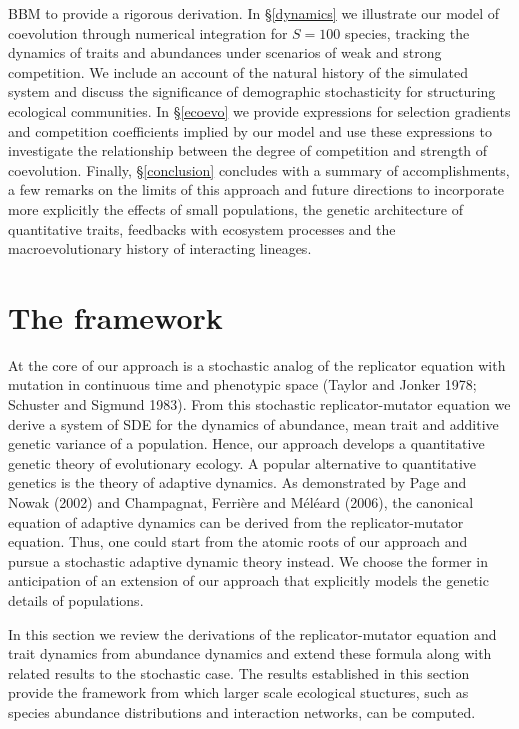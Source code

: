 \documentclass[]{article}
\begin{document}
BBM to provide a rigorous derivation. In \S\ref{dynamics} we illustrate
our model of coevolution through numerical integration for \(S=100\)
species, tracking the dynamics of traits and abundances under scenarios
of weak and strong competition. We include an account of the natural
history of the simulated system and discuss the significance of
demographic stochasticity for structuring ecological communities. In
\S\ref{ecoevo} we provide expressions for selection gradients and
competition coefficients implied by our model and use these expressions
to investigate the relationship between the degree of competition and
strength of coevolution. Finally, \S\ref{conclusion} concludes with a
summary of accomplishments, a few remarks on the limits of this approach
and future directions to incorporate more explicitly the effects of
small populations, the genetic architecture of quantitative traits,
feedbacks with ecosystem processes and the macroevolutionary history of
interacting lineages.

\hypertarget{the-framework}{%
\section{The framework}\label{the-framework}}

At the core of our approach is a stochastic analog of the replicator
equation with mutation in continuous time and phenotypic space (Taylor
and Jonker 1978; Schuster and Sigmund 1983). From this stochastic
replicator-mutator equation we derive a system of SDE for the dynamics
of abundance, mean trait and additive genetic variance of a population.
Hence, our approach develops a quantitative genetic theory of
evolutionary ecology. A popular alternative to quantitative genetics is
the theory of adaptive dynamics. As demonstrated by Page and Nowak
(2002) and Champagnat, Ferrière and Méléard (2006), the canonical
equation of adaptive dynamics can be derived from the replicator-mutator
equation. Thus, one could start from the atomic roots of our approach
and pursue a stochastic adaptive dynamic theory instead. We choose the
former in anticipation of an extension of our approach that explicitly
models the genetic details of populations.

In this section we review the derivations of the replicator-mutator
equation and trait dynamics from abundance dynamics and extend these
formula along with related results to the stochastic case. The results
established in this section provide the framework from which larger
scale ecological stuctures, such as species abundance distributions and
interaction networks, can be computed.
\end{document}
